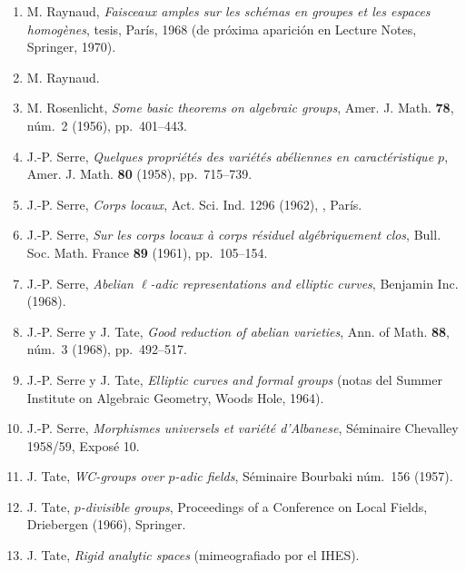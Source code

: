 \begin{enumerate}
\item[{[23]}] M. Raynaud, \emph{Faisceaux amples sur les schémas en
  groupes et les espaces homogènes}, tesis, París, 1968 (de próxima
  aparición en Lecture Notes, Springer, 1970).
\item[{[24]}] M. Raynaud.
\item[{[25]}] M. Rosenlicht, \emph{Some basic theorems on algebraic
  groups}, Amer. J. Math. \textbf{78}, núm.~2 (1956), pp.~401--443.
\item[{[25bis]}] J.-P. Serre, \emph{Quelques propriétés des variétés
  abéliennes en caractéristique $p$}, Amer. J. Math. \textbf{80} (1958),
  pp.~715--739.
\item[{[26]}] J.-P. Serre, \emph{Corps locaux}, Act. Sci. Ind. 1296
  (1962), , París.
\item[{[27]}] J.-P. Serre, \emph{Sur les corps locaux à corps résiduel
  algébriquement clos}, Bull. Soc. Math. France \textbf{89} (1961),
  pp.~105--154.
\item[{[28]}] J.-P. Serre, \emph{Abelian $\ell$-adic representations and
  elliptic curves}, Benjamin Inc. (1968).
\item[{[29]}] J.-P. Serre y J. Tate, \emph{Good reduction of abelian
  varieties}, Ann. of Math. \textbf{88}, núm.~3 (1968), pp.~492--517.
\item[{[30]}] J.-P. Serre y J. Tate, \emph{Elliptic curves and formal
  groups} (notas del Summer Institute on Algebraic Geometry, Woods Hole,
  1964).
\item[{[31]}] J.-P. Serre, \emph{Morphismes universels et variété
  d'Albanese}, Séminaire Chevalley 1958/59, Exposé 10.
\item[{[32]}] J. Tate, \emph{WC-groups over $p$-adic fields}, Séminaire
  Bourbaki núm.~156 (1957).
\item[{[33]}] J. Tate, \emph{$p$-divisible groups}, Proceedings of a
  Conference on Local Fields, Driebergen (1966), Springer.
\item[{[34]}] J. Tate, \emph{Rigid analytic spaces} (mimeografiado por
  el IHES).
\end{enumerate}

